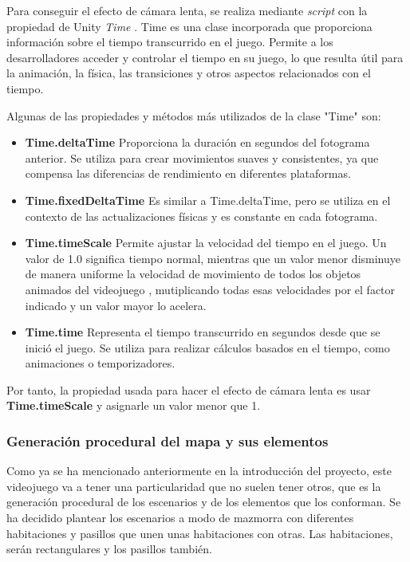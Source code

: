 Para conseguir el efecto de cámara lenta, se realiza mediante \textit{script} con la propiedad de Unity \textit{Time} \cite{Time}. Time es una clase incorporada que proporciona información sobre el tiempo transcurrido en el juego. Permite a los desarrolladores acceder y controlar el tiempo en su juego, lo que resulta útil para la animación, la física, las transiciones y otros aspectos relacionados con el tiempo.

Algunas de las propiedades y métodos más utilizados de la clase "Time" son:
 
\begin{itemize}    
    \item \textbf{Time.deltaTime} Proporciona la duración en segundos del fotograma anterior. Se utiliza para crear movimientos suaves y consistentes, ya que compensa las diferencias de rendimiento en diferentes plataformas.
   
    \item \textbf{Time.fixedDeltaTime}  Es similar a Time.deltaTime, pero se utiliza en el contexto de las actualizaciones físicas y es constante en cada fotograma.

    \item \textbf{Time.timeScale}  Permite ajustar la velocidad del tiempo en el juego. Un valor de 1.0 significa tiempo normal, mientras que un valor menor disminuye de manera uniforme la velocidad de movimiento de todos los objetos animados del videojuego , mutiplicando todas esas velocidades por el factor indicado y un valor mayor lo acelera.

    \item \textbf{Time.time} Representa el tiempo transcurrido en segundos desde que se inició el juego. Se utiliza para realizar cálculos basados en el tiempo, como animaciones o temporizadores.
\end{itemize}

Por tanto, la propiedad usada para hacer el efecto de cámara lenta es usar \textbf{Time.timeScale} y asignarle un valor menor que 1.

\subsubsection{Generación procedural del mapa y sus elementos}

Como ya se ha mencionado anteriormente en la introducción del proyecto, este videojuego va a tener una particularidad que no suelen tener otros, que es la generación procedural de los escenarios y de los elementos que los conforman. Se ha decidido plantear los escenarios a modo de mazmorra con diferentes habitaciones y pasillos que unen unas habitaciones con otras. Las habitaciones, serán rectangulares y los pasillos también.

